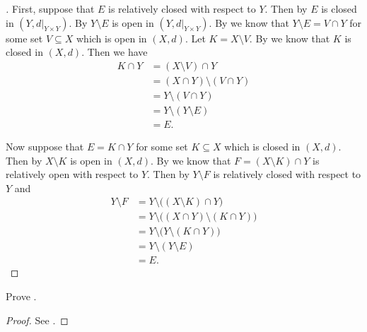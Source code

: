 \begin{proof}[]
  First, suppose that \(E\) is relatively closed with respect to \(Y\).
  Then by  \(E\) is closed in \((Y, d|_{Y \times Y})\).
  By  \(Y \setminus E\) is open in \((Y, d|_{Y \times Y})\).
  By  we know that \(Y \setminus E = V \cap Y\) for some set \(V \subseteq X\) which is open in \((X, d)\).
  Let \(K = X \setminus V\).
  By  we know that \(K\) is closed in \((X, d)\).
  Then we have
  \begin{align*}
    K \cap Y & = (X \setminus V) \cap Y          \\
             & = (X \cap Y) \setminus (V \cap Y) \\
             & = Y \setminus (V \cap Y)          \\
             & = Y \setminus (Y \setminus E)     \\
             & = E.
  \end{align*}

  Now suppose that \(E = K \cap Y\) for some set \(K \subseteq X\) which is closed in \((X, d)\).
  Then by  \(X \setminus K\) is open in \((X, d)\).
  By  we know that \(F = (X \setminus K) \cap Y\) is relatively open with respect to \(Y\).
  Then by  \(Y \setminus F\) is relatively closed with respect to \(Y\) and
  \begin{align*}
    Y \setminus F & = Y \setminus \big((X \setminus K) \cap Y\big)          \\
                  & = Y \setminus \big((X \cap Y) \setminus (K \cap Y)\big) \\
                  & = Y \setminus \big(Y \setminus (K \cap Y)\big)          \\
                  & = Y \setminus (Y \setminus E)                           \\
                  & = E.
  \end{align*}
\end{proof}

\exercisesection

\begin{ex}\label{ii:ex:1.3.1}
  Prove .
\end{ex}

\begin{proof}
  See .
\end{proof}
